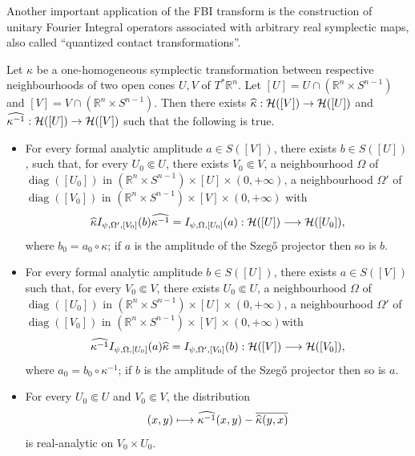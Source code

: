 \documentclass[10pt]{amsart}
\theoremstyle{definition}\newtheorem{defi}[theo]{Definition}\newtheorem{rema}[theo]{Remark}\newtheorem{exam}[theo]{Example}\newtheorem{exem}[theo]{Example}\newtheorem{nota}[theo]{Notation}
\DeclareMathOperator{\diag}{diag}
\newcommand{\clH}{\mathcal{H}}
\newcommand\1{\mathds{1}}
\newcommand{\R}{\mathbb{R}}
\let\oldhat\hat
\renewcommand*{\hat}[1]{\mathchoice{\widehat{#1}}{\widehat{#1}}{\oldhat{#1}}{\oldhat{#1}}}
\renewcommand*{\to}{\mathchoice{\longrightarrow}{\rightarrow}{\rightarrow}{\rightarrow}}
\let\oldmapsto\mapsto
\renewcommand*{\mapsto}{\mathchoice{\longmapsto}{\oldmapsto}{\oldmapsto}{\oldmapsto}}
\begin{document}
Another important application of the FBI transform is the construction of unitary Fourier {Integral} operators associated with arbitrary real symplectic maps, also called ``quantized contact transformations''.

\begin{prop}\label{prop:quantized-contact}
Let $\kappa$ be a one-homogeneous symplectic transformation between respective neighbourhoods of two open cones $U,V$ of $T^*\R^n$. Let $[U]=U\cap (\R^n\times S^{n-1})$ and $[V]=V\cap (\R^n\times S^{n-1})$. Then there exists $\hat{\kappa}:\clH([V])\to \clH([U])$ and $\widehat{\kappa^{-1}}:\clH([U])\to \clH([V])$ such that the following is true.
\begin{itemize}
\item\label{prop4.25.1} For every formal analytic amplitude $a\in S([V])$, there exists $b\in S([U])$, such that, for every $U_0\Subset U$, there exists $V_0\Subset V$, a neighbourhood $\Omega$ of $\diag([U_0])$ in $(\R^n\times S^{n-1})\times [U]\times (0,+\infty)$, a neighbourhood $\Omega'$ of $\diag([V_0])$ in $(\R^n\times S^{n-1})\times [V]\times (0,+\infty)$ with
\[
\hat{\kappa}I_{\psi,\Omega',[V_0]}(b)\widehat{\kappa^{-1}}=I_{\psi,\Omega,[U_0]}(a):\clH([U])\to \clH([U_0]),
\]
where $b_0=a_0\circ \kappa$; if $a$ is the amplitude of the Szeg\H{o} projector then so is $b$.
\item\label{prop4.25.2} For every formal analytic amplitude $b\in S([U])$, there exists $a\in S([V])$ such that, for every $V_0\Subset V$, there exists $U_0\Subset U$, a neighbourhood $\Omega$ of $\diag([U_0])$ in $(\R^n\times S^{n-1})\times [U]\times (0,+\infty)$, a neighbourhood $\Omega'$ of $\diag([V_0])$ in $(\R^n\times S^{n-1})\times [V]\times (0,+\infty)$with
\[
\widehat{\kappa^{-1}}I_{\psi,\Omega,[U_0]}(a)\hat{\kappa}=I_{\psi,\Omega',[V_0]}(b):\clH([V])\to \clH([V_0]),
\]
where $a_0=b_0\circ \kappa^{-1}$; if $b$ is the amplitude of the Szeg\H{o} projector then so is $a$.
\item\label{prop4.25.3} For every $U_0\Subset U$ and $V_0\Subset V$, the distribution
\[
(x,y)\mapsto
\widehat{\kappa^{-1}}(x,y)-\overline{\hat{\kappa}(y,x)}
\]
is real-analytic on $V_0\times U_0$.
\end{itemize}
\end{prop}
\end{document}
